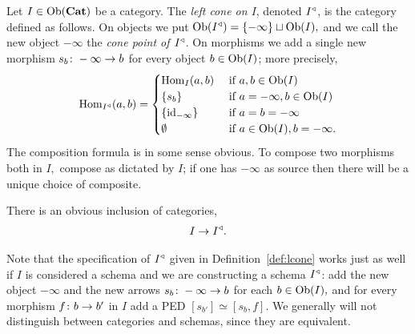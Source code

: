 \documentclass[../main/CT4S-EN-RU]{subfiles}
\begin{document}
\begin{definitionENG}\label{def:lcone}
Let $I\in\operatorname{Ob}({\mathbf{Cat}})$ be a category. The {\em left cone on $I$}, denoted $I^\triangleleft$, is the category defined as follows. On objects we put $\operatorname{Ob}(I^\triangleleft)=\{-\infty\}\sqcup\operatorname{Ob}(I),$ and we call the new object $-\infty$ the {\em cone point of $I^\triangleleft$}. On morphisms we add a single new morphism $s_b\colon-\infty\rightarrow b$ for every object $b\in\operatorname{Ob}(I)$; more precisely,
$$\operatorname{Hom}_{I^\triangleleft}(a,b)=
\begin{cases}
\operatorname{Hom}_I(a,b)&\textnormal{ if }a,b\in\operatorname{Ob}(I)\\
\{s_b\}&\textnormal{ if }a=-\infty, b\in\operatorname{Ob}(I)\\
\{\operatorname{id}_{-\infty}\}&\textnormal{ if } a=b=-\infty\\
\emptyset&\textnormal{ if } a\in\operatorname{Ob}(I), b=-\infty.
\end{cases}$$
The composition formula is in some sense obvious. To compose two morphisms both in $I,$ compose as dictated by $I$; if one has $-\infty$ as source then there will be a unique choice of composite.

There is an obvious inclusion of categories,
\begin{align}\label{dia:inclusion into cone}
I\rightarrow I^\triangleleft.
\end{align}
\end{definitionENG}

\begin{definitionRUS}\label{def:lcone}
\end{definitionRUS}

\begin{remarkENG}\label{rem:schemas are cats!}
Note that the specification of $I^\triangleleft$ given in Definition~\ref{def:lcone} works just as well if $I$ is considered a schema and we are constructing a schema $I^\triangleleft$: add the new object $-\infty$ and the new arrows $s_b\colon-\infty\rightarrow b$ for each $b\in\operatorname{Ob}(I),$ and for every morphism $f\colon b\rightarrow b'$ in $I$ add a PED $[s_{b'}]\simeq[s_b,f].$ We generally will not distinguish between categories and schemas, since they are equivalent.
\end{remarkENG}

\begin{remarkRUS}\label{rem:schemas are cats!}
\end{remarkRUS}
\end{document}
